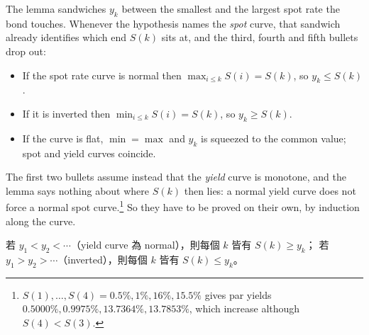 The lemma sandwiches $y_{k}$ between the smallest and the largest spot rate the bond touches.
Whenever the hypothesis names the \emph{spot} curve, that sandwich already identifies which end $S(k)$ sits at, and the third, fourth and fifth bullets drop out:

\begin{itemize}[itemsep=0.3em]
	\item If the spot rate curve is normal then $\max_{i\le k}S(i)=S(k)$, so $y_{k}\le S(k)$.
	\item If it is inverted then $\min_{i\le k}S(i)=S(k)$, so $y_{k}\ge S(k)$.
	\item If the curve is flat, $\min=\max$ and $y_{k}$ is squeezed to the common value; spot and yield curves coincide.
\end{itemize}

The first two bullets assume instead that the \emph{yield} curve is monotone, and the lemma says nothing about where $S(k)$ then lies: a normal yield curve does not force a normal spot curve.\footnote{%
	$S(1),\ldots,S(4) = 0.5\%, 1\%, 16\%, 15.5\%$ gives par yields $0.5000\%, 0.9975\%, 13.7364\%, 13.7853\%$, which increase although $S(4)<S(3)$.}
So they have to be proved on their own, by induction along the curve.

\begin{proposition}
	\label{prop:par-vs-spot}
	若 $y_{1}<y_{2}<\cdots$（yield curve 為 normal），則每個 $k$ 皆有 $S(k)\ge y_{k}$；
	若 $y_{1}>y_{2}>\cdots$（inverted），則每個 $k$ 皆有 $S(k)\le y_{k}$。
\end{proposition}

